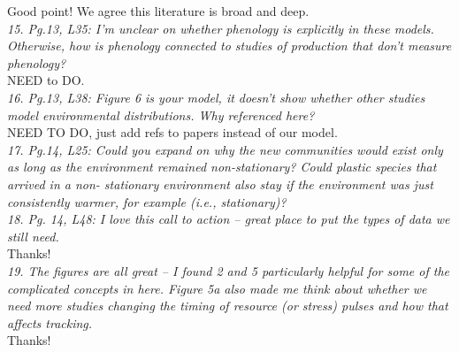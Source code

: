 \documentclass[11pt]{article}
\begin{document}
Good point! We agree this literature is broad and deep.\\

\emph{15.     Pg.13, L35: I'm unclear on whether phenology is explicitly in these models.
Otherwise, how is phenology connected to studies of production that don't measure phenology?}\\

NEED to DO.\\

\emph{16.     Pg.13, L38: Figure 6 is your model, it doesn't show whether other studies model
environmental distributions. Why referenced here?}\\

NEED TO DO, just add refs to papers instead of our model.\\

\emph{17.     Pg.14, L25: Could you expand on why the new communities would exist only as long as
the environment remained non-stationary? Could plastic species that arrived in a non-
stationary environment also stay if the environment was just consistently warmer, for example
(i.e., stationary)?}\\

\emph{18.     Pg. 14, L48: I love this call to action – great place to put the types of data we
still need.}\\

Thanks!\\

\emph{19.     The figures are all great – I found 2 and 5 particularly helpful for some of the
complicated concepts in here. Figure 5a also made me think about whether we need more studies
changing the timing of resource (or stress) pulses and how that affects tracking.}\\

Thanks!\\



\end{document}

